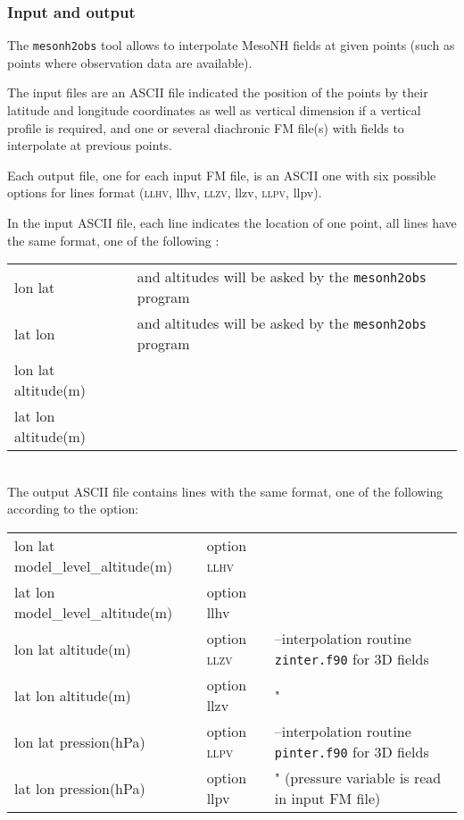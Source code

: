 \subsubsection{Input and output}
The \texttt{mesonh2obs} tool allows to interpolate MesoNH fields 
at given points (such as points where observation data are available). 

The input files are an ASCII file indicated the position of the points by their
latitude and longitude coordinates as well as vertical dimension if a vertical profile is required, and one or several diachronic FM file(s) with fields to interpolate
at previous points.

Each output file, one for each input FM file, is an ASCII one with six possible
options for lines format
(\textsc{llhv}, llhv, \textsc{llzv}, llzv, \textsc{llpv}, llpv).

In the input ASCII file, each line indicates the location of one point,
all lines have the same format, one of the following :\\
\begin{tabular}{l|ll}
 lon lat & and altitudes will be asked by the {\tt mesonh2obs} program\\
 lat lon & and altitudes will be asked by the {\tt mesonh2obs} program\\
 lon lat altitude(m) & \\
 lat lon altitude(m) & \\   
\end{tabular} \\

The output ASCII file contains lines with the same format, one of the 
following according to the option: \\
\begin{tabular}{l|ll}
 lon lat model\_level\_altitude(m)& option \textsc{llhv} \\
 lat lon model\_level\_altitude(m)& option llhv \\
 lon lat altitude(m) & option \textsc{llzv}&
 --interpolation routine \texttt{zinter.f90} for 3D fields\\
 lat lon altitude(m) & option llzv& \hspace*{1cm} " \\
 lon lat pression(hPa) & option \textsc{llpv} &
 --interpolation routine \texttt{pinter.f90} for 3D fields\\
 lat lon pression(hPa) & option llpv& \hspace*{1cm} "   (pressure variable is read in input FM file) \\
\end{tabular} \\



